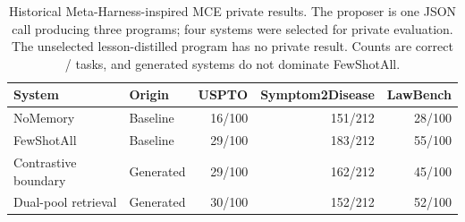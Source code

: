 \begin{table}[t]
\caption{Historical Meta-Harness-inspired MCE private results. The proposer is one JSON call producing three programs; four systems were selected for private evaluation. The unselected lesson-distilled program has no private result. Counts are correct / tasks, and generated systems do not dominate FewShotAll.}
\label{tab:mce}
\small
\centering
\begin{tabular}{@{}llrrr@{}}
\toprule
System & Origin & USPTO & Symptom2Disease & LawBench \\
\midrule
NoMemory & Baseline & 16/100 & 151/212 & 28/100 \\
FewShotAll & Baseline & 29/100 & 183/212 & 55/100 \\
Contrastive boundary & Generated & 29/100 & 162/212 & 45/100 \\
Dual-pool retrieval & Generated & 30/100 & 152/212 & 52/100 \\
\bottomrule
\end{tabular}
\end{table}
